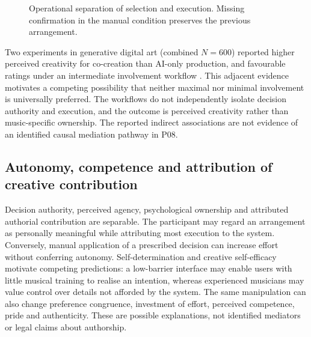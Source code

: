 \documentclass[11pt]{article}
\begin{document}
\begin{figure}[ht]
\centering
{}
\caption{Operational separation of selection and execution. Missing confirmation in the manual condition preserves the previous arrangement.}
\end{figure}
Two experiments in generative digital art (combined $N=600$) reported higher perceived creativity for co-creation than AI-only production, and favourable ratings under an intermediate involvement workflow \citep{wangchen2026}. This adjacent evidence motivates a competing possibility that neither maximal nor minimal involvement is universally preferred. The workflows do not independently isolate decision authority and execution, and the outcome is perceived creativity rather than music-specific ownership. The reported indirect associations are not evidence of an identified causal mediation pathway in P08.

\subsection{Autonomy, competence and attribution of creative contribution}
Decision authority, perceived agency, psychological ownership and attributed authorial contribution are separable. The participant may regard an arrangement as personally meaningful while attributing most execution to the system. Conversely, manual application of a prescribed decision can increase effort without conferring autonomy. Self-determination and creative self-efficacy motivate competing predictions: a low-barrier interface may enable users with little musical training to realise an intention, whereas experienced musicians may value control over details not afforded by the system. The same manipulation can also change preference congruence, investment of effort, perceived competence, pride and authenticity. These are possible explanations, not identified mediators or legal claims about authorship.
\end{document}
